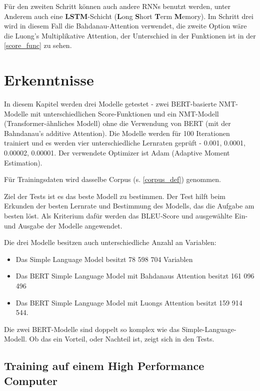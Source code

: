 Für den zweiten Schritt können auch andere RNNs benutzt werden, unter Anderem auch eine \textbf{LSTM}-Schicht (\textbf{L}ong \textbf{S}hort \textbf{T}erm \textbf{M}emory). Im Schritt drei wird in diesem Fall die Bahdanau-Attention verwendet, die zweite Option wäre die Luong's Multiplikative Attention, der Unterschied in der Funktionen ist in der \cref{score_func} zu sehen.

\section{Erkenntnisse} \label{BSLM_analysis}

In diesem Kapitel werden drei Modelle getestet - zwei BERT-basierte NMT-Modelle mit unterschiedlichen Score-Funktionen und ein NMT-Modell (Transformer-ähnliches Modell) ohne die Verwendung von BERT (mit der Bahndanau's additive Attention). Die Modelle werden für 100 Iterationen trainiert und es werden vier unterschiedliche Lernraten geprüft - 0.001, 0.0001, 0.00002, 0.00001. Der verwendete Optimizer ist Adam (Adaptive Moment Estimation).

Für Trainingsdaten wird dasselbe Corpus (s. \cref{corpus_def}) genommen.

Ziel der Tests ist es das beste Modell zu bestimmen. Der Test hilft beim Erkunden der besten Lernrate und Bestimmung des Modells, das die Aufgabe  am besten löst. Als Kriterium dafür werden das BLEU-Score und ausgewählte Ein- und Ausgabe der Modelle angewendet.

Die drei Modelle besitzen auch unterschiedliche Anzahl an Variablen:
\begin{itemize}
	\item Das Simple Language Model besitzt 78 598 704 Variablen
	\item Das BERT Simple Language Model mit Bahdanaus Attention besitzt 161 096 496
	\item Das BERT Simple Language Model mit Luongs Attention besitzt 159 914 544.
\end{itemize}

Die zwei BERT-Modelle sind doppelt so komplex wie das Simple-Language-Modell. Ob das ein Vorteil, oder Nachteil ist, zeigt sich in den Tests.

\subsection{Training auf einem High Performance Computer}

